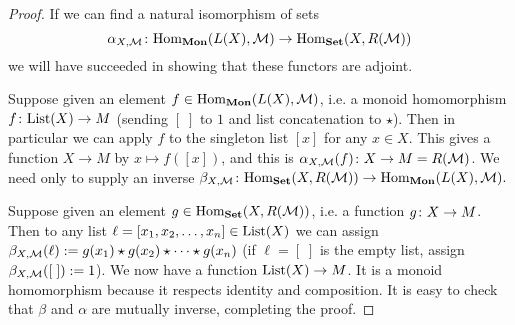 \documentclass[CT4S-EN-RU]{subfiles}
\begin{document}
\begin{proof}

If we can find a natural isomorphism of sets 
$$\alpha_{X,\mathcal{M}}\colon\textnormal{Hom}_{\bf Mon}(L(X),\mathcal{M})\rightarrow\textnormal{Hom}_{\bf Set}(X,R(\mathcal{M}))$$
we will have succeeded in showing that these functors are adjoint.

Suppose given an element $f\in\textnormal{Hom}_{\bf Mon}(L(X),\mathcal{M})$, i.e. a monoid homomorphism $f\colon\textnormal{List}(X)\rightarrow M$ (sending $[\;]$ to $1$ and list concatenation to $\star$). Then in particular we can apply $f$ to the singleton list $[x]$ for any $x\in X$. This gives a function $X\to M$ by $x\mapsto f([x])$, and this is $\alpha_{X,\mathcal{M}}(f)\colon X\rightarrow M=R(\mathcal{M})$. We need only to supply an inverse $\beta_{X,\mathcal{M}}\colon\textnormal{Hom}_{\bf Set}(X,R(\mathcal{M}))\rightarrow\textnormal{Hom}_{\bf Mon}(L(X),\mathcal{M}).$

Suppose given an element $g\in\textnormal{Hom}_{\bf Set}(X,R(\mathcal{M}))$, i.e. a function $g\colon X\rightarrow M$. Then to any list $\ell=[x_1,x_2,\ldots,x_n]\in\textnormal{List}(X)$ we can assign $\beta_{X,\mathcal{M}}(\ell):=g(x_1)\star g(x_2)\star\cdots\star g(x_n)$ (if $\ell=[\;]$ is the empty list, assign $\beta_{X,\mathcal{M}}([\;]):=1$). We now have a function $\textnormal{List}(X)\rightarrow M$. It is a monoid homomorphism because it respects identity and composition. It is easy to check that $\beta$ and $\alpha$ are mutually inverse, completing the proof.

\end{proof}
\end{document}
